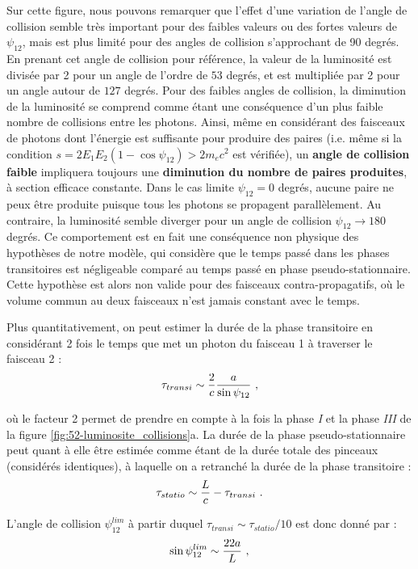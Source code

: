 \begin{refsection}
Sur cette figure, nous pouvons remarquer que l'effet d'une variation de l'angle de collision semble très important pour des faibles valeurs ou des fortes valeurs de $\psi_{12}$, mais est plus limité pour des angles de collision s'approchant de 90 degrés. En prenant cet angle de collision pour référence, la valeur de la luminosité est divisée par 2 pour un angle de l'ordre de $53$ degrés, et est multipliée par 2 pour un angle autour de $127$ degrés. Pour des faibles angles de collision, la diminution de la luminosité se comprend comme étant une conséquence d'un plus faible nombre de collisions entre les photons. Ainsi, même en considérant des faisceaux de photons dont l'énergie est suffisante pour produire des paires (i.e. même si la condition $s=2 E_1 E_2 (1-\cos{\psi_{12}})>2m_e c^2$ est vérifiée), un \textbf{angle de collision faible} impliquera toujours une \textbf{diminution du nombre de paires produites}, à section efficace constante. Dans le cas limite $\psi_{12}=0$ degrés, aucune paire ne peux être produite puisque tous les photons se propagent parallèlement. Au contraire, la luminosité semble diverger pour un angle de collision $\psi_{12} \to 180$ degrés. Ce comportement est en fait une conséquence non physique des hypothèses de notre modèle, qui considère que le temps passé dans les phases transitoires est négligeable comparé au temps passé en phase pseudo-stationnaire. Cette hypothèse est alors non valide pour des faisceaux contra-propagatifs, où le volume commun au deux faisceaux n'est jamais constant avec le temps. 

Plus quantitativement, on peut estimer la durée de la phase transitoire en considérant 2 fois le temps que met un photon du faisceau 1 à traverser le faisceau 2 :
\begin{equation}
    \tau_{transi} \sim \dfrac{2}{c}\dfrac{a}{\sin\psi_{12}} ~ \rm ,
\end{equation}

où le facteur 2 permet de prendre en compte à la fois la phase \textit{I} et la phase \textit{III} de la figure \ref{fig:52-luminosite_collisions}a. La durée de la phase pseudo-stationnaire peut quant à elle être estimée comme étant de la durée totale des pinceaux (considérés identiques), à laquelle on a retranché la durée de la phase transitoire :
\begin{equation}
    \tau_{statio} \sim \dfrac{L}{c} -\tau_{transi} ~ \rm .
\end{equation}

L'angle de collision $\psi_{12}^{lim}$ à partir duquel $\tau_{transi}\sim \tau_{statio}/10$ est donc donné par :
\begin{equation}
    \sin{\psi_{12}^{lim}} \sim \dfrac{22 a}{L} ~ \rm ,
\end{equation}


\end{refsection}
